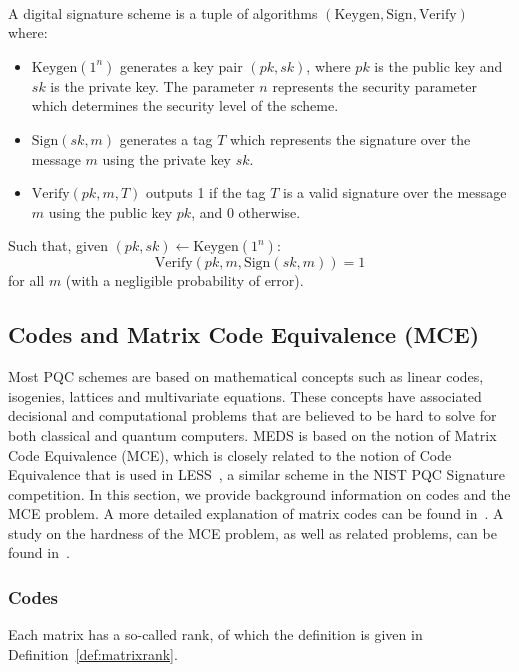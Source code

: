 \documentclass[11pt,a4paper]{report}
\theoremstyle{definition}
\begin{document}
\begin{definition}~\\
  \label{def:signaturescheme}
  A digital signature scheme is a tuple of algorithms $(\text{Keygen}, \text{Sign}, \text{Verify})$ where:
  \begin{itemize}
    \item $\text{Keygen}(1^n)$ generates a key pair $(pk, sk)$, where $pk$ is the public key and $sk$ is the private key. The parameter $n$ represents the security parameter which determines the security level of the scheme.
    \item $\text{Sign}(sk, m)$ generates a tag $T$ which represents the signature over the message $m$ using the private key $sk$.
    \item $\text{Verify}(pk, m, T)$ outputs 1 if the tag $T$ is a valid signature over the message $m$ using the public key $pk$, and 0 otherwise.
  \end{itemize}
  \pagebreak
  Such that, given $(pk, sk) \leftarrow \text{Keygen}(1^n)$:
  \[
    \text{Verify}(pk, m, \text{Sign}(sk, m)) = 1
  \]
  for all $m$ (with a negligible probability of error).
\end{definition}

\subsection{Codes and Matrix Code Equivalence (MCE)}
\label{sec:codes}
Most PQC schemes are based on mathematical concepts such as linear codes, isogenies, lattices and multivariate equations. These concepts have associated decisional and computational problems that are believed to be hard to solve for both classical and quantum computers. MEDS is based on the notion of Matrix Code Equivalence (MCE), which is closely related to the notion of Code Equivalence that is used in LESS~\cite{biasse2020less}, a similar scheme in the NIST PQC Signature competition. In this section, we provide background information on codes and the MCE problem. A more detailed explanation of matrix codes can be found in~\cite{gorla2021rank}. A study on the hardness of the MCE problem, as well as related problems, can be found in~\cite{reijnders2024hardness}.

\subsubsection{Codes}
Each matrix has a so-called rank, of which the definition is given in Definition~\ref{def:matrixrank}.
\end{document}
